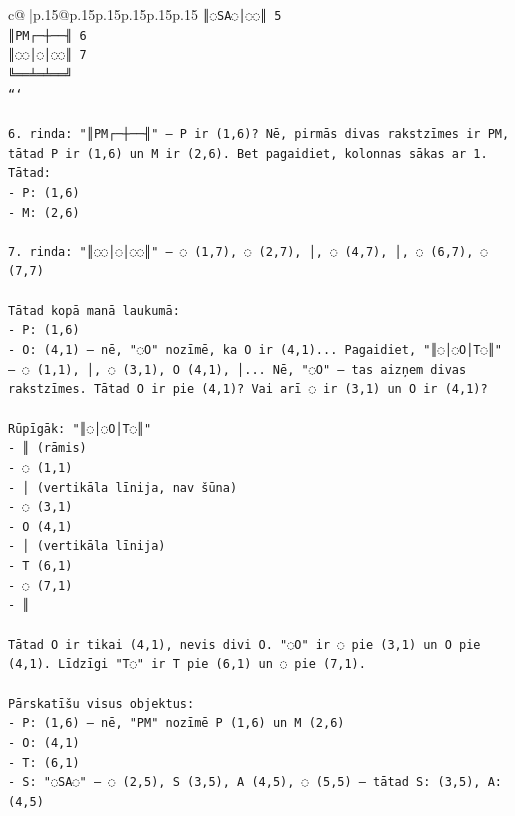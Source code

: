 \documentclass{article}
\begin{document}
{\begin{supertabular}{c@{$\;$}|p{.15\linewidth}@{}p{.15\linewidth}p{.15\linewidth}p{.15\linewidth}p{.15\linewidth}p{.15\linewidth}}
{{{\texttt{║◌SA◌│◌◌║ 5} \\
\texttt{║PM┌─┼──╢ 6} \\
\texttt{║◌◌│◌│◌◌║ 7} \\
\texttt{╚══╧═╧══╝} \\
\texttt{```} \\
\\ 
\texttt{6. rinda: "║PM┌─┼──╢" — P ir (1,6)? Nē, pirmās divas rakstzīmes ir PM, tātad P ir (1,6) un M ir (2,6). Bet pagaidiet, kolonnas sākas ar 1. Tātad:} \\
\texttt{{-} P: (1,6)} \\
\texttt{{-} M: (2,6)} \\
\\ 
\texttt{7. rinda: "║◌◌│◌│◌◌║" — ◌ (1,7), ◌ (2,7), │, ◌ (4,7), │, ◌ (6,7), ◌ (7,7)} \\
\\ 
\texttt{Tātad kopā manā laukumā:} \\
\texttt{{-} P: (1,6)} \\
\texttt{{-} O: (4,1) — nē, "◌O" nozīmē, ka O ir (4,1)... Pagaidiet, "║◌│◌O│T◌║" — ◌ (1,1), │, ◌ (3,1), O (4,1), │... Nē, "◌O" — tas aizņem divas rakstzīmes. Tātad O ir pie (4,1)? Vai arī ◌ ir (3,1) un O ir (4,1)?} \\
\\ 
\texttt{Rūpīgāk: "║◌│◌O│T◌║"} \\
\texttt{{-} ║ (rāmis)} \\
\texttt{{-} ◌ (1,1)} \\
\texttt{{-} │ (vertikāla līnija, nav šūna)} \\
\texttt{{-} ◌ (3,1)} \\
\texttt{{-} O (4,1)} \\
\texttt{{-} │ (vertikāla līnija)} \\
\texttt{{-} T (6,1)} \\
\texttt{{-} ◌ (7,1)} \\
\texttt{{-} ║} \\
\\ 
\texttt{Tātad O ir tikai (4,1), nevis divi O. "◌O" ir ◌ pie (3,1) un O pie (4,1). Līdzīgi "T◌" ir T pie (6,1) un ◌ pie (7,1).} \\
\\ 
\texttt{Pārskatīšu visus objektus:} \\
\texttt{{-} P: (1,6) — nē, "PM" nozīmē P (1,6) un M (2,6)} \\
\texttt{{-} O: (4,1)} \\
\texttt{{-} T: (6,1)} \\
\texttt{{-} S: "◌SA◌" — ◌ (2,5), S (3,5), A (4,5), ◌ (5,5) — tātad S: (3,5), A: (4,5)} \\
}}}
\end{supertabular}}
\end{document}
